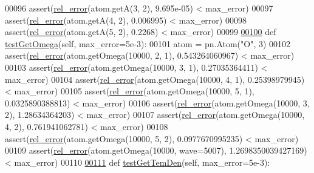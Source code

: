 \begin{DoxyCode}
00096                 assert(\hyperlink{namespacepyneb_1_1test_1_1unit_test_aff3b7f847905c444d8b10727f10de236}{rel\_error}(atom.getA(3, 2), 9.695e-05) < max\_error)
00097                 assert(\hyperlink{namespacepyneb_1_1test_1_1unit_test_aff3b7f847905c444d8b10727f10de236}{rel\_error}(atom.getA(4, 2), 0.006995) < max\_error)
00098                 assert(\hyperlink{namespacepyneb_1_1test_1_1unit_test_aff3b7f847905c444d8b10727f10de236}{rel\_error}(atom.getA(5, 2), 0.2268) < max\_error)
00099 
\hypertarget{unit_test_8py_source_l00100}{}\hyperlink{classpyneb_1_1test_1_1unit_test_1_1_unit_test_a75cb0860a7a06b129a1028ca635eacf6}{00100}         \textcolor{keyword}{def }\hyperlink{classpyneb_1_1test_1_1unit_test_1_1_unit_test_a75cb0860a7a06b129a1028ca635eacf6}{testGetOmega}(self, max\_error=5e-3):
00101                 atom = pn.Atom(\textcolor{stringliteral}{"O"}, 3)
00102                 assert(\hyperlink{namespacepyneb_1_1test_1_1unit_test_aff3b7f847905c444d8b10727f10de236}{rel\_error}(atom.getOmega(10000, 2, 1), 0.543264060967) < max\_error)
00103                 assert(\hyperlink{namespacepyneb_1_1test_1_1unit_test_aff3b7f847905c444d8b10727f10de236}{rel\_error}(atom.getOmega(10000, 3, 1), 0.27035364411) < max\_error)
00104                 assert(\hyperlink{namespacepyneb_1_1test_1_1unit_test_aff3b7f847905c444d8b10727f10de236}{rel\_error}(atom.getOmega(10000, 4, 1), 0.25398979945) < max\_error)
00105                 assert(\hyperlink{namespacepyneb_1_1test_1_1unit_test_aff3b7f847905c444d8b10727f10de236}{rel\_error}(atom.getOmega(10000, 5, 1), 0.0325890388813) < max\_error)
00106                 assert(\hyperlink{namespacepyneb_1_1test_1_1unit_test_aff3b7f847905c444d8b10727f10de236}{rel\_error}(atom.getOmega(10000, 3, 2), 1.28634364203) < max\_error)
00107                 assert(\hyperlink{namespacepyneb_1_1test_1_1unit_test_aff3b7f847905c444d8b10727f10de236}{rel\_error}(atom.getOmega(10000, 4, 2), 0.761941062781) < max\_error)
00108                 assert(\hyperlink{namespacepyneb_1_1test_1_1unit_test_aff3b7f847905c444d8b10727f10de236}{rel\_error}(atom.getOmega(10000, 5, 2), 0.0977670995235) < max\_error)
00109                 assert(\hyperlink{namespacepyneb_1_1test_1_1unit_test_aff3b7f847905c444d8b10727f10de236}{rel\_error}(atom.getOmega(10000, wave=5007), 1.2698350039427169) < max\_error)
00110                 
\hypertarget{unit_test_8py_source_l00111}{}\hyperlink{classpyneb_1_1test_1_1unit_test_1_1_unit_test_a8340dae4a77382c9c82c1ce67209d47a}{00111}         \textcolor{keyword}{def }\hyperlink{classpyneb_1_1test_1_1unit_test_1_1_unit_test_a8340dae4a77382c9c82c1ce67209d47a}{testGetTemDen}(self, max\_error=5e-3):

\end{DoxyCode}
